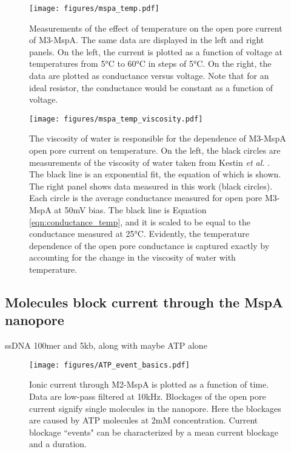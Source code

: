 \begin{figure}[h]
\begin{centering}
\texttt{[image: figures/mspa\_temp.pdf]}
\caption[MspA current versus temperature]{Measurements of the effect of temperature on the open pore current of M3-MspA.  The same data are displayed in the left and right panels.  On the left, the current is plotted as a function of voltage at temperatures from 5°C to 60°C in steps of 5°C.  On the right, the data are plotted as conductance versus voltage.  Note that for an ideal resistor, the conductance would be constant as a function of voltage.}
\label{fig:mspa_current_temp}
\end{centering}
\end{figure}

\begin{figure}[h]
\begin{centering}
\texttt{[image: figures/mspa\_temp\_viscosity.pdf]}
\caption[MspA current versus temperature explained by viscosity]{The viscosity of water is responsible for the dependence of M3-MspA open pore current on temperature.  On the left, the black circles are measurements of the viscosity of water taken from Kestin \textit{et al.} \cite{Kestin1978}.  The black line is an exponential fit, the equation of which is shown.  The right panel shows data measured in this work (black circles).  Each circle is the average conductance measured for open pore M3-MspA at 50mV bias.  The black line is Equation \ref{eqn:conductance_temp}, and it is scaled to be equal to the conductance measured at 25°C.  Evidently, the temperature dependence of the open pore conductance is captured exactly by accounting for the change in the viscosity of water with temperature.}
\label{fig:mspa_current_temp_viscosity}
\end{centering}
\end{figure}

\subsection{Molecules block current through the MspA nanopore}

ssDNA 100mer and 5kb, along with maybe ATP alone

\begin{figure}[h]
\begin{centering}
\texttt{[image: figures/ATP\_event\_basics.pdf]}
\caption[Current blockage events in the MspA nanopore]{Ionic current through M2-MspA is plotted as a function of time.  Data are low-pass filtered at 10kHz.  Blockages of the open pore current signify single molecules in the nanopore.  Here the blockages are caused by ATP molecules at 2mM concentration.  Current blockage ``events" can be characterized by a mean current blockage and a duration.}
\label{fig:mspa_event_basics}
\end{centering}
\end{figure}


